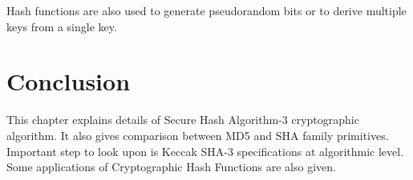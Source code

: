 Hash functions are also used to generate pseudorandom bits or to derive multiple keys from a single key.

\section{Conclusion}

This chapter explains details of Secure Hash Algorithm-3 cryptographic algorithm. It also gives comparison between MD5 and SHA family primitives. Important step to look upon is Keccak SHA-3 specifications at algorithmic level. Some applications of Cryptographic Hash Functions are also given.
